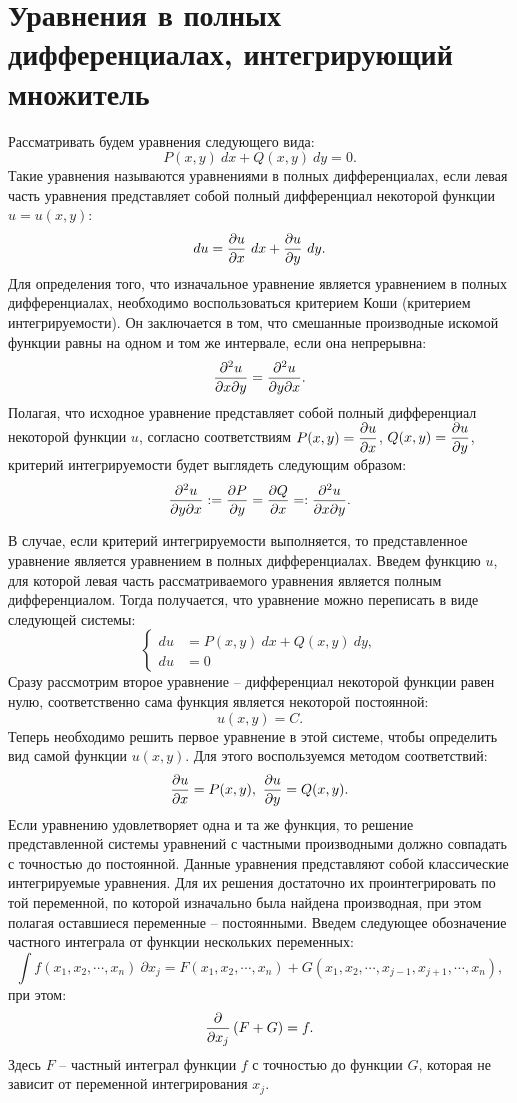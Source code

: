 \section{Уравнения в полных дифференциалах, интегрирующий множитель}
	
	Рассматривать будем уравнения следующего вида:
	\[ P(x, y) ~ dx  + Q(x, y) ~ dy = 0. \]
	Такие уравнения называются уравнениями в полных дифференциалах, если левая часть уравнения представляет собой полный дифференциал некоторой функции $u = u(x, y)$:
	\[ du = \dfrac{\partial u}{\partial x} ~ dx + \dfrac{\partial u}{\partial y} ~ dy. \]
	Для определения того, что изначальное уравнение является уравнением в полных дифференциалах, необходимо воспользоваться критерием Коши (критерием интегрируемости). Он заключается в том, что смешанные производные искомой функции равны на одном и том же интервале, если она непрерывна:
	\[ \dfrac{\partial^2 u}{\partial x \partial y} = \dfrac{\partial^2 u}{\partial y \partial x}. \]
	Полагая, что исходное уравнение представляет собой полный дифференциал некоторой функции $u$, согласно соответствиям $P(x, y) = \dfrac{\partial u}{\partial x}$, $Q(x, y) = \dfrac{\partial u}{\partial y}$, критерий интегрируемости будет выглядеть следующим образом:
	\[ \dfrac{\partial^2 u}{\partial y \partial x} := \dfrac{\partial P}{\partial y} = \dfrac{\partial Q}{\partial x} =: \dfrac{\partial^2 u}{\partial x \partial y}. \]

	В случае, если критерий интегрируемости выполняется, то представленное уравнение является уравнением в полных дифференциалах. Введем функцию $u$, для которой левая часть рассматриваемого уравнения является полным дифференциалом. Тогда получается, что уравнение можно переписать в виде следующей системы:
	\[ \left\lbrace \begin{split} du &= P(x, y) ~ dx + Q(x, y) ~ dy, \\ du &= 0 \end{split} \right. \]
	Сразу рассмотрим второе уравнение -- дифференциал некоторой функции равен нулю, соответственно сама функция является некоторой постоянной:
	\[ u(x, y) = C. \]
	Теперь необходимо решить первое уравнение в этой системе, чтобы определить вид самой функции $u(x, y)$. Для этого воспользуемся методом соответствий:
	\[ \dfrac{\partial u}{\partial x} = P(x, y), ~ \dfrac{\partial u}{\partial y} = Q(x, y). \]
	Если уравнению удовлетворяет одна и та же функция, то решение представленной системы уравнений с частными производными должно совпадать с точностью до постоянной. Данные уравнения представляют собой классические интегрируемые уравнения. Для их решения достаточно их проинтегрировать по той переменной, по которой изначально была найдена производная, при этом полагая оставшиеся переменные -- постоянными. Введем следующее обозначение частного интеграла от функции нескольких переменных:
	\[ \int f(x_1, x_2, \cdots, x_n) ~ \partial x_j = F(x_1, x_2, \cdots, x_n) + G(x_1, x_2, \cdots, x_{j-1}, x_{j+1}, \cdots, x_n), \]
	при этом:
	\[\dfrac{\partial }{\partial x_j} \left( F + G \right) = f. \]
	Здесь $F$ -- частный интеграл функции $f$ с точностью до функции $G$, которая не зависит от переменной интегрирования $x_j$.

